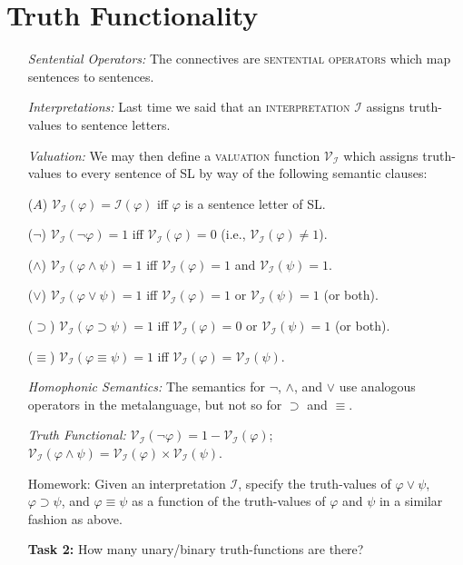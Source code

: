 \documentclass[a4paper, 11pt]{article} %
\newcommand{\I}{\mathcal{I}}
\newcommand{\V}[1]{\mathcal{V}_{#1}} %
\begin{document}
\section*{Truth Functionality}

\begin{enumerate}[leftmargin=1.5in,labelsep=.15in] %
  \item[\it Sentential Operators:] The connectives are \textsc{sentential operators} which map sentences to sentences.
  \item[\it Interpretations:] Last time we said that an \textsc{interpretation} $\I$ assigns truth-values to sentence letters.
  \item[\it Valuation:] We may then define a \textsc{valuation} function $\V{\I}$ which assigns truth-values to every sentence of SL by way of the following semantic clauses:
    \item[($A$)] $\V{\I}(\varphi)=\I(\varphi)$ iff $\varphi$ is a sentence letter of SL.
    \item[($\neg$)] $\V{\I}(\neg\varphi)=1$ iff $\V{\I}(\varphi)=0$ (i.e., $\V{\I}(\varphi)\neq 1$).
    \item[($\wedge$)] $\V{\I}(\varphi \wedge \psi)=1$ iff $\V{\I}(\varphi)=1$ and $\V{\I}(\psi)=1$.
    \item[($\vee$)] $\V{\I}(\varphi \vee \psi)=1$ iff $\V{\I}(\varphi)=1$ or $\V{\I}(\psi)=1$ (or both).
    \item[($\supset$)] $\V{\I}(\varphi \supset \psi)=1$ iff $\V{\I}(\varphi)=0$ or $\V{\I}(\psi)=1$ (or both).
    \item[($\equiv$)] $\V{\I}(\varphi \equiv \psi)=1$ iff $\V{\I}(\varphi)=\V{\I}(\psi)$.
  \item[\it Homophonic Semantics:] The semantics for $\neg$, $\wedge$, and $\vee$ use analogous operators in the metalanguage, but not so for $\supset$ and $\equiv$. 
  \item[\it Truth Functional:] $\V{\I}(\neg\varphi)=1-\V{\I}(\varphi)$;\\
    $\V{\I}(\varphi\wedge\psi)=\V{\I}(\varphi)\times\V{\I}(\psi)$.
  \item[\sc Homework:] Given an interpretation $\I$, specify the truth-values of $\varphi\vee\psi$, $\varphi\supset\psi$, and $\varphi\equiv\psi$ as a function of the truth-values of $\varphi$ and $\psi$ in a similar fashion as above.
  \item[\bf Task 2:] How many unary/binary truth-functions are there?
\end{enumerate}
\end{document}
